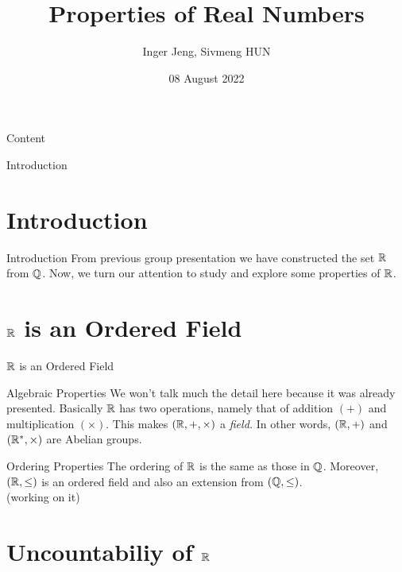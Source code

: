 \documentclass{beamer}
\title{\bfseries Properties of Real Numbers}
\author{Inger Jeng, Sivmeng HUN}
\institute{Student of MAC: Cohort II}
\date{08 August 2022}
\begin{document}
\begin{frame}[plain]
  \maketitle
\end{frame}
\begin{frame}[plain]{Content}
  \tableofcontents
\end{frame}
\begin{frame}[plain]
  \begin{center}
    {\huge\color{blue} Introduction}
  \end{center}
\end{frame}
\section{Introduction}
\begin{frame}{Introduction}
  From previous group presentation we have constructed the
  set $\R$ from $\Q$. Now, we turn our attention to study and 
  explore some properties of $\R$.
\end{frame}
\section{$\R$ is an Ordered Field}
\begin{frame}[plain]
  \begin{center}
    {\huge\color{blue} $\R$ is an Ordered Field}
  \end{center}
\end{frame}
\begin{frame}{Algebraic Properties}
  We won't talk much the detail here because it was already presented.
  Basically $\R$ has two operations, namely that of addition $(+)$ and
  multiplication $(\times)$. This makes $(\R, +,\times)$ a \emph{field.}
  In other words, $(\R,+)$ and $(\R^{\ast},\times)$ are Abelian groups.

\end{frame}
\begin{frame}{Ordering Properties}
  The ordering of $\R$ is the same as those in $\Q$.
  Moreover, $(\R, \leq)$ is an ordered field and also an extension
  from $(\Q, \leq)$.\\[0.3cm]
  (working on it)
\end{frame}

\section{Uncountabiliy of $\R$}
\end{document}
